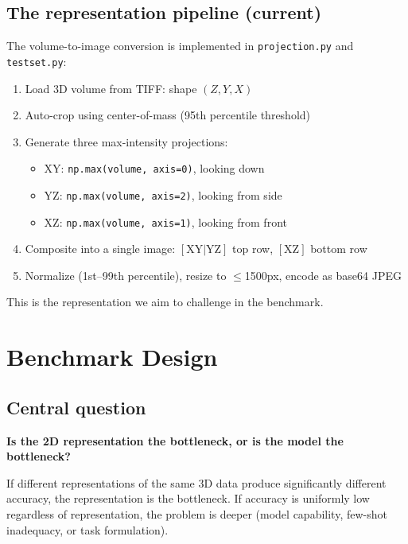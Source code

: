 \documentclass[11pt, a4paper]{article}
\begin{document}
\subsection{The representation pipeline (current)}

The volume-to-image conversion is implemented in
\texttt{projection.py} and \texttt{testset.py}:

\begin{enumerate}[leftmargin=*, itemsep=2pt]
  \item Load 3D volume from TIFF: shape $(Z, Y, X)$
  \item Auto-crop using center-of-mass (95th percentile threshold)
  \item Generate three max-intensity projections:
    \begin{itemize}[itemsep=0pt]
      \item XY: \texttt{np.max(volume, axis=0)}, looking down
      \item YZ: \texttt{np.max(volume, axis=2)}, looking from side
      \item XZ: \texttt{np.max(volume, axis=1)}, looking from front
    \end{itemize}
  \item Composite into a single image: $[\text{XY}|\text{YZ}]$ top row,
    $[\text{XZ}]$ bottom row
  \item Normalize (1st--99th percentile), resize to $\leq$1500px, encode as
    base64 JPEG
\end{enumerate}

This is the representation we aim to challenge in the benchmark.

\section{Benchmark Design}

\subsection{Central question}

\textbf{Is the 2D representation the bottleneck, or is the model the bottleneck?}

If different representations of the same 3D data produce significantly different
accuracy, the representation is the bottleneck. If accuracy is uniformly low
regardless of representation, the problem is deeper (model capability, few-shot
inadequacy, or task formulation).
\end{document}
